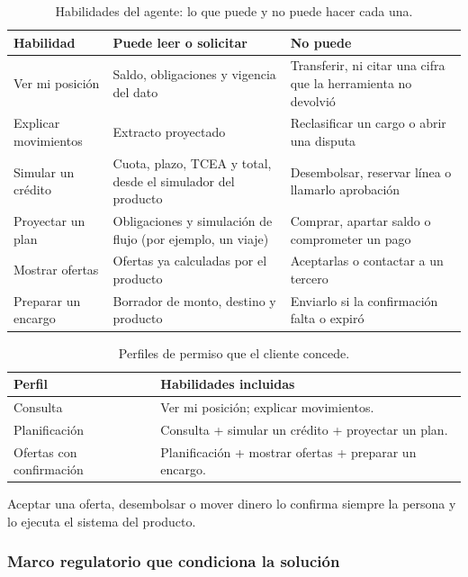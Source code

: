 \documentclass[11pt,a4paper]{article}
\begin{document}
\begin{table}[H]
\centering
\caption{Habilidades del agente: lo que puede y no puede hacer cada una.}
\small
\begin{tabularx}{\textwidth}{@{}p{3.1cm} X X@{}}
\toprule
\textbf{Habilidad} & \textbf{Puede leer o solicitar} & \textbf{No puede} \\
\midrule
Ver mi posición      & Saldo, obligaciones y vigencia del dato & Transferir, ni citar una cifra que la herramienta no devolvió \\
Explicar movimientos & Extracto proyectado & Reclasificar un cargo o abrir una disputa \\
Simular un crédito   & Cuota, plazo, TCEA y total, desde el simulador del producto & Desembolsar, reservar línea o llamarlo aprobación \\
Proyectar un plan    & Obligaciones y simulación de flujo (por ejemplo, un viaje) & Comprar, apartar saldo o comprometer un pago \\
Mostrar ofertas      & Ofertas ya calculadas por el producto & Aceptarlas o contactar a un tercero \\
Preparar un encargo  & Borrador de monto, destino y producto & Enviarlo si la confirmación falta o expiró \\
\bottomrule
\end{tabularx}
\end{table}

\begin{table}[H]
\centering
\caption{Perfiles de permiso que el cliente concede.}
\small
\begin{tabularx}{\textwidth}{@{}p{3.6cm} X@{}}
\toprule
\textbf{Perfil} & \textbf{Habilidades incluidas} \\
\midrule
Consulta & Ver mi posición; explicar movimientos. \\
Planificación & Consulta + simular un crédito + proyectar un plan. \\
Ofertas con confirmación & Planificación + mostrar ofertas + preparar un encargo. \\
\bottomrule
\end{tabularx}
\end{table}

Aceptar una oferta, desembolsar o mover dinero lo confirma siempre la persona y lo ejecuta el sistema del producto.

\subsubsection{Marco regulatorio que condiciona la solución}
\end{document}
